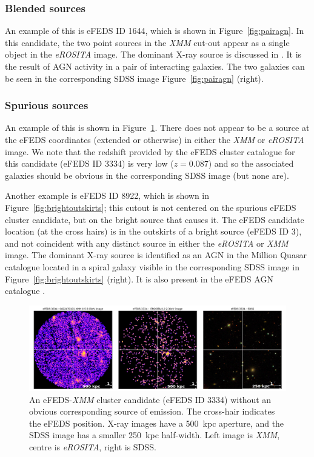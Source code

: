 \documentclass[fleqn,usenatbib]{mnras}
\begin{document}
\subsubsection{Blended sources}

An example of this is eFEDS ID 1644, which is shown in Figure~\ref{fig:pairagn}. In this candidate, the two point sources in the {\em XMM} cut-out appear as a single object in the {\em eROSITA} image. The dominant X-ray source is discussed in \cite{agnpair}. It is the result of AGN activity in a pair of interacting galaxies. The two galaxies can be seen in the corresponding SDSS image Figure~\ref{fig:pairagn} (right). 

\subsubsection{Spurious sources}
\label{subsec:spurious}
An example of this is shown in Figure~\ref{fig:blanksky}. There does not appear to be a source at the eFEDS coordinates (extended or otherwise) in either the {\em XMM} or {\em eROSITA} image. We note that the redshift provided by the eFEDS cluster catalogue for this candidate (eFEDS ID 3334) is very low ($z=0.087$) and so the associated galaxies should be obvious in the corresponding SDSS image (but none are). 

Another example is eFEDS ID 8922, which is shown in Figure~\ref{fig:brightoutskirts}; this cutout is not centered on the spurious eFEDS cluster candidate, but on the bright source that causes it. The eFEDS candidate location (at the cross hairs) is in the outskirts of a bright source (eFEDS ID 3), and not coincident with any distinct source in either the {\em eROSITA} or {\em XMM} image. The dominant X-ray source is identified as an AGN in the Million Quasar catalogue \citep{milliquas} located in a spiral galaxy visible in the corresponding SDSS image in Figure~\ref{fig:brightoutskirts} (right). It is also present in the eFEDS AGN catalogue \citep[][]{efedsagn}.

\begin{figure}
    \centering
    \includegraphics[width=1\textwidth]{images/blank_lowz.png}
    \caption[]{An eFEDS-{\em XMM} cluster candidate (eFEDS ID 3334) without an obvious corresponding source of emission. The cross-hair indicates the eFEDS position. X-ray images have a 500~kpc aperture, and the SDSS image has a smaller 250~kpc half-width. Left image is {\em XMM}, centre is {\em eROSITA}, right is SDSS.}
    \label{fig:blanksky}
\end{figure}
\end{document}
